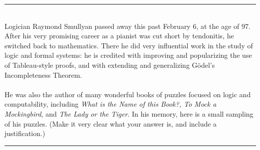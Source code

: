 \documentclass[12pt,letterpaper,boxed,cm]{hmcpset}
\begin{document}
\begin{solution}
    \vfill
\end{solution}
\newpage
\hrule
~\\
Logician Raymond Smullyan passed away this past February 6, at the age of 97. After his very promising career as a pianist was cut short by tendonitis, he switched back to mathematics. There he did very influential work in the study of logic and formal systems: he is credited with improving and popularizing the use of Tableau-style proofs, and with extending and generalizing G\"odel's Incompleteness Theorem.\\\\
He was also the author of many wonderful books of puzzles focused on logic and computability, including \emph{What is the Name of this Book?, To Mock a Mockingbird}, and \emph{The Lady or the Tiger}. In his memory, here is a small sampling of his puzzles. (Make it very clear what your answer is, and include a justification.)
\hrule
\end{document}
